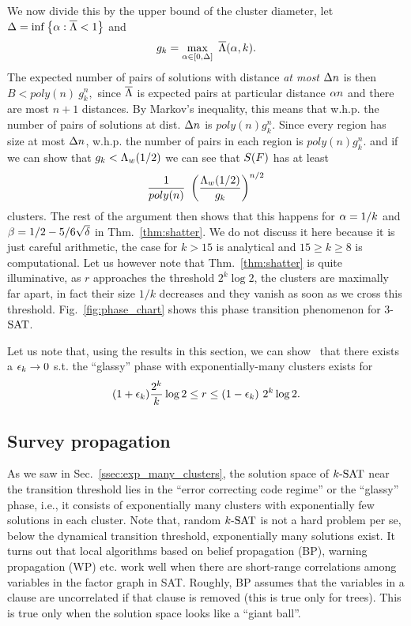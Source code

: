 \documentclass[letterpaper, 10pt, twocolumn, reqno]{amsart}
\begin{document}
We now divide this by the upper bound of the cluster diameter, let $\D = \inf \cbrac{\a: \bL < 1}$ and
$$g_k = \max_{\a \in [0,\D]}\ \bL(\a,k).$$
The expected
number of pairs of solutions with distance \emph{at most} $\D n$ is then
$B < poly(n)\ g_k^n,$
since $\bL$ is expected pairs at particular distance $\a n$
and there are most $n+1$ distances. By Markov's inequality, this means that w.h.p. the number of pairs of solutions at dist. $\D n$ is $poly(n) g_k^n$. Since
every region has size at most $\D n$, w.h.p. the number of pairs in each region is $poly(n) g_k^n$. and if we can show that $g_k < \L_w(1/2)$ we can
see that $\sf$ has at least
$$
\f{1}{poly(n)}\ \rbrac{\f{\L_w(1/2)}{g_k}}^{n/2}
$$
clusters. The rest of the argument then shows that this happens for $\a = 1/k$ and $\b = 1/2 - 5/6\sqrt{\d}$ in Thm.~\ref{thm:shatter}. We do not discuss it here because it is just careful arithmetic, the case for $k > 15$ is analytical and $15 \geq k \geq 8$ is computational. Let us however note that Thm.~\ref{thm:shatter} is quite illuminative, as $r$ approaches the threshold $2^k \log 2$, the clusters are maximally far apart, in fact their size $1/k$ decreases and they vanish as soon as we cross this threshold. Fig.~\ref{fig:phase_chart} shows this phase transition phenomenon for 3-$\SAT$.

Let us note that, using the results in this section, we can show~\cite{achlioptas2008algorithmic} that there exists a $\e_k \to 0$ s.t. the ``glassy'' phase with exponentially-many clusters exists for
$$
(1 +\e_k) \f{2^k}{k} \log 2 \leq r \leq (1-\e_k)\ 2^k \log 2.
$$

\subsection{Survey propagation}
\label{ssec:survey_propagation}

As we saw in Sec.~\ref{ssec:exp_many_clusters}, the solution space of $\ksat$ near the transition threshold lies in the ``error correcting code regime'' or the ``glassy'' phase, i.e., it consists of exponentially many clusters with exponentially few solutions in each cluster. Note that, random $\ksat$ is not a hard problem per se, below the dynamical transition threshold, exponentially many solutions exist. It turns out that local algorithms based on belief propagation (BP), warning propagation (WP) etc. work well when there are short-range correlations among variables in the factor graph in SAT. Roughly, BP assumes that the variables in a clause are uncorrelated if that clause is removed (this is true only for trees). This is true only when the solution space looks like a ``giant ball''.
\end{document}
